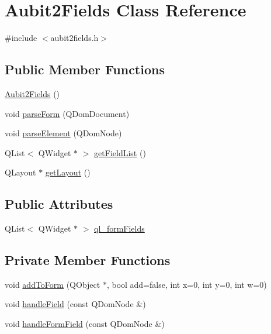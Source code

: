 \hypertarget{classAubit2Fields}{
\section{Aubit2Fields Class Reference}
\label{classAubit2Fields}
}


{\ttfamily \#include $<$aubit2fields.h$>$}

\subsection*{Public Member Functions}
\begin{DoxyCompactItemize}
\item 
\hyperlink{classAubit2Fields_aafa7c2764922bafd18652b126c8de901}{Aubit2Fields} ()
\item 
void \hyperlink{classAubit2Fields_a7dd159573c8f4d465b9b9968257729cf}{parseForm} (QDomDocument)
\item 
void \hyperlink{classAubit2Fields_a217bfecc3db98089ffad7649f221003d}{parseElement} (QDomNode)
\item 
QList$<$ QWidget $\ast$ $>$ \hyperlink{classAubit2Fields_a36c95075ce26ecc98dd7378daad3b6b6}{getFieldList} ()
\item 
QLayout $\ast$ \hyperlink{classAubit2Fields_ae1c754b5ab84e1c023e8ec57c4576b56}{getLayout} ()
\end{DoxyCompactItemize}
\subsection*{Public Attributes}
\begin{DoxyCompactItemize}
\item 
QList$<$ QWidget $\ast$ $>$ \hyperlink{classAubit2Fields_a57520a544c310f8c9a96cef7d6ffaaf4}{ql\_\-formFields}
\end{DoxyCompactItemize}
\subsection*{Private Member Functions}
\begin{DoxyCompactItemize}
\item 
void \hyperlink{classAubit2Fields_a4aa443642d7d73a76766ed5ee4c82475}{addToForm} (QObject $\ast$, bool add=false, int x=0, int y=0, int w=0)
\item 
void \hyperlink{classAubit2Fields_a160c6a3194c259b4082650831f9f6cd1}{handleField} (const QDomNode \&)
\item 
void \hyperlink{classAubit2Fields_a1306814dcbcc29fb3daf4d35d7d3955b}{handleFormField} (const QDomNode \&)
\end{DoxyCompactItemize}

